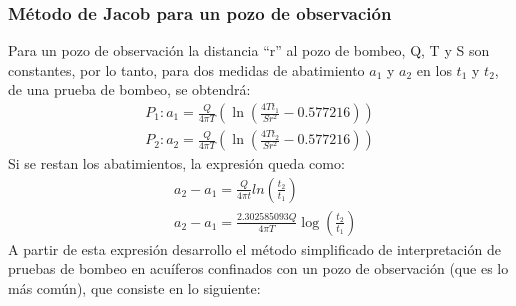 \subsubsection{Método de Jacob para un pozo de observación}
Para un pozo de observación la distancia ``r'' al pozo de bombeo, Q, T y S son constantes, por lo tanto, para dos medidas de abatimiento $a_1$ y $a_2$ en los $t_1$ y $t_2$, de una prueba de bombeo, se obtendrá:
\begin{align*}
    P_1:a_1 = \frac{Q}{4 \pi T}\left(\ln{\left(\frac{4Tt_1}{Sr^2}  - 0.577216 \right)}\right)\\
    P_2:a_2 = \frac{Q}{4 \pi T}\left(\ln{\left(\frac{4Tt_2}{Sr^2}  - 0.577216 \right)}\right) 
\end{align*}
Si se restan los abatimientos, la expresión queda como:
\begin{align*}
    &a_2 - a_1= \frac{Q}{4\pi t}ln{\left(\frac{t_2}{t_1}\right)}\\
    &a_2 - a_1 = \frac{2.302585093Q}{4 \pi T} \log{\left(\frac{t_2}{t_1}\right)}
\end{align*}
A partir de esta expresión desarrollo el método simplificado de interpretación de pruebas de bombeo en acuíferos confinados con un pozo de observación (que es lo más común), que consiste en lo siguiente:
